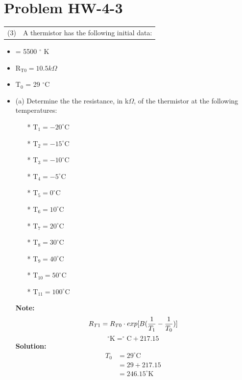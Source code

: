 \documentclass{article}
\newcommand{\problemstatement}[3]{
\noindent
\begin{tabular}{ m{0.5cm} m{42em}}
	({#1}) & {#2}
\end{tabular}
}
\begin{document}
\section{Problem HW-4-3}
\problemstatement{3}{A thermistor has the following initial data:}{}
\begin{itemize}
	\item {} = 5500 \textbf{$^{\circ}$} K
	\item $\text{R}_\text{T0} = 10.5 k \Omega$
	\item $\text{T}_0$ = 29 \textbf{$^{\circ}$}C
\end{itemize}
\begin{itemize}
	\item (a) Determine the the resistance, in k$\Omega$, of the thermistor at the following temperatures: \\
	\begin{itemize}
		\item[*] $\text{T}_{1} = -20 ^{\circ} \text{C}$
		\item[*] $\text{T}_{2} = -15 ^{\circ} \text{C}$
		\item[*] $\text{T}_{3} = -10 ^{\circ} \text{C}$
		\item[*] $\text{T}_{4} = -5 ^{\circ} \text{C}$
		\item[*] $\text{T}_{5} = 0 ^{\circ} \text{C}$
		\item[*] $\text{T}_{6} = 10 ^{\circ} \text{C}$
		\item[*] $\text{T}_{7} = 20 ^{\circ} \text{C}$
		\item[*] $\text{T}_{8} = 30 ^{\circ} \text{C}$
		\item[*] $\text{T}_{9} = 40 ^{\circ} \text{C}$
		\item[*] $\text{T}_{10} = 50 ^{\circ} \text{C}$
		\item[*] $\text{T}_{11} = 100 ^{\circ} \text{C}$
	\end{itemize}
		\textbf{Note:}
		\begin{equation}
			R_{T1} = R_{T0} \cdot exp[B({1 \over T_1} - {1 \over T_0})]
		\end{equation}
		\begin{equation}
			^{\circ} \text{K} = ^{\circ} \text{C} + 217.15 
		\end{equation}
		\textbf{Solution:}
		\begin{align*}
			T_0 &= 29 ^{\circ} \text{C} \\
				&= 29 + 217.15 \\
				&= 246.15 ^{\circ} \text{K} \\

\end{align*}
\end{itemize}
\end{document}
